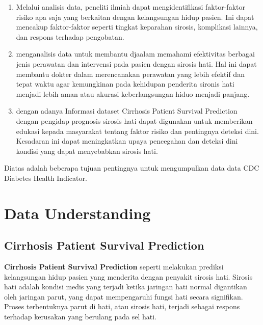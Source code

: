 \documentclass[
  letterpaper,
]{krantz}
\begin{document}
\begin{enumerate}
\def\labelenumi{\arabic{enumi}.}
\item
  Melalui analisis data, peneliti ilmiah dapat mengidentifikasi
  faktor-faktor risiko apa saja yang berkaitan dengan kelangsungan hidup
  pasien. Ini dapat mencakup faktor-faktor seperti tingkat keparahan
  sirosis, komplikasi lainnya, dan respons terhadap pengobatan.
\item
  menganalisis data untuk membantu djaalam memahami efektivitas berbagai
  jenis perawatan dan intervensi pada pasien dengan sirosis hati. Hal
  ini dapat membantu dokter dalam merencanakan perawatan yang lebih
  efektif dan tepat waktu agar kemungkinan pada kehidupan penderita
  sironis hati menjadi lebih aman atau akurasi keberlangsungan hiduo
  menjadi panjang.
\item
  dengan adanya Informasi dataset Cirrhosis Patient Survival Prediction
  dengan pengidap prognosis sirosis hati dapat digunakan untuk
  memberikan edukasi kepada masyarakat tentang faktor risiko dan
  pentingnya deteksi dini. Kesadaran ini dapat meningkatkan upaya
  pencegahan dan deteksi dini kondisi yang dapat menyebabkan sirosis
  hati.
\end{enumerate}

Diatas adalah beberapa tujuan pentingnya untuk mengumpulkan data data
CDC Diabetes Health Indicator.


\hypertarget{data-understanding}{%
\chapter*{Data Understanding}\label{data-understanding}}


\hypertarget{cirrhosis-patient-survival-prediction}{%
\section*{Cirrhosis Patient Survival
Prediction}\label{cirrhosis-patient-survival-prediction}}


\textbf{Cirrhosis Patient Survival Prediction} seperti melakukan
prediksi kelangsungan hidup pasien yang menderita dengan penyakit
sirosis hati. Sirosis hati adalah kondisi medis yang terjadi ketika
jaringan hati normal digantikan oleh jaringan parut, yang dapat
mempengaruhi fungsi hati secara signifikan. Proses terbentuknya parut di
hati, atau sirosis hati, terjadi sebagai respons terhadap kerusakan yang
berulang pada sel hati.
\end{document}
